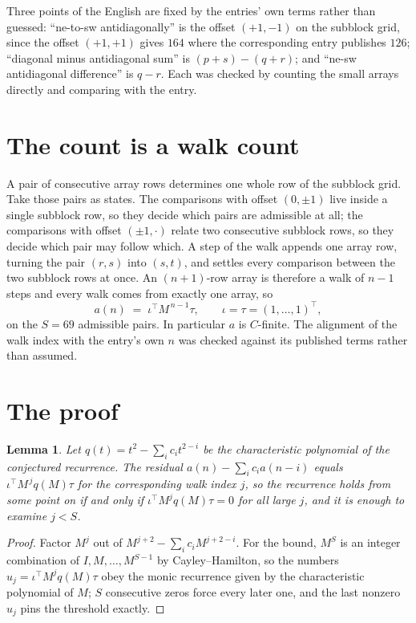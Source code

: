 \documentclass[11pt,a4paper]{article}
\theoremstyle{plain}
\newtheorem{lemma}[theorem]{Lemma}
\theoremstyle{definition}
\begin{document}
Three points of the English are fixed by the entries' own terms rather than guessed:
``ne-to-sw antidiagonally'' is the offset $(+1,-1)$ on the subblock grid, since the offset
$(+1,+1)$ gives $164$ where the corresponding entry publishes $126$; ``diagonal minus
antidiagonal sum'' is $(p+s)-(q+r)$; and ``ne-sw antidiagonal difference'' is $q-r$. Each was
checked by counting the small arrays directly and comparing with the entry.

\section{The count is a walk count}

A pair of consecutive array rows determines one whole row of the subblock grid. Take those
pairs as states. The comparisons with offset $(0,\pm1)$ live inside a single subblock row, so
they decide which pairs are admissible at all; the comparisons with offset $(\pm1,\cdot)$
relate two consecutive subblock rows, so they decide which pair may follow which. A step of the
walk appends one array row, turning the pair $(r,s)$ into $(s,t)$, and settles every comparison
between the two subblock rows at once. An $(n+1)$-row array is therefore a walk of $n-1$ steps
and every walk comes from exactly one array, so
\[
a(n)\;=\;\iota^{\!\top}M^{\,n-1}\tau,\qquad \iota=\tau=(1,\dots,1)^{\!\top},
\]
on the $S=69$ admissible pairs. In particular $a$ is $C$-finite. The alignment of the walk
index with the entry's own $n$ was checked against its published terms rather than assumed.

\section{The proof}

\begin{lemma}\label{lem:crit}
Let $q(t)=t^{2}-\sum_i c_it^{2-i}$ be the characteristic polynomial of the
conjectured recurrence. The residual $a(n)-\sum_ic_ia(n-i)$ equals
$\iota^{\!\top}M^{\,j}q(M)\tau$ for the corresponding walk index $j$, so the recurrence
holds from some point on if and only if $\iota^{\!\top}M^{j}q(M)\tau=0$ for all large $j$,
and it is enough to examine $j<S$.
\end{lemma}

\begin{proof}
Factor $M^{j}$ out of $M^{j+2}-\sum_ic_iM^{j+2-i}$. For the bound, $M^{S}$
is an integer combination of $I,M,\dots,M^{S-1}$ by Cayley--Hamilton, so the numbers
$u_j=\iota^{\!\top}M^{j}q(M)\tau$ obey the monic recurrence given by the characteristic
polynomial of $M$; $S$ consecutive zeros force every later one, and the last nonzero $u_j$
pins the threshold exactly.
\end{proof}
\end{document}

